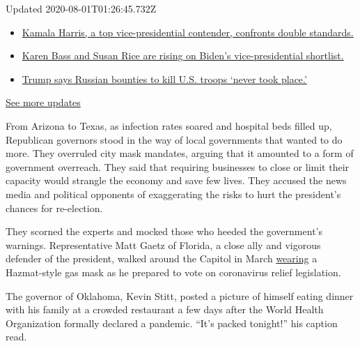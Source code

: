 Updated 2020-08-01T01:26:45.732Z

\begin{itemize}
\tightlist
\item
  \href{https://www.nytimes.com/2020/07/31/us/elections/biden-vs-trump.html?action=click\&pgtype=Article\&state=default\&region=MAIN_CONTENT_1\&context=storylines_live_updates\#link-29fdff45}{Kamala
  Harris, a top vice-presidential contender, confronts double
  standards.}
\item
  \href{https://www.nytimes.com/2020/07/31/us/elections/biden-vs-trump.html?action=click\&pgtype=Article\&state=default\&region=MAIN_CONTENT_1\&context=storylines_live_updates\#link-13ec3d9c}{Karen
  Bass and Susan Rice are rising on Biden's vice-presidential
  shortlist.}
\item
  \href{https://www.nytimes.com/2020/07/31/us/elections/biden-vs-trump.html?action=click\&pgtype=Article\&state=default\&region=MAIN_CONTENT_1\&context=storylines_live_updates\#link-49e9a016}{Trump
  says Russian bounties to kill U.S. troops `never took place.'}
\end{itemize}

\href{https://www.nytimes.com/2020/07/31/us/elections/biden-vs-trump.html?action=click\&pgtype=Article\&state=default\&region=MAIN_CONTENT_1\&context=storylines_live_updates}{See
more updates}

From Arizona to Texas, as infection rates soared and hospital beds
filled up, Republican governors stood in the way of local governments
that wanted to do more. They overruled city mask mandates, arguing that
it amounted to a form of government overreach. They said that requiring
businesses to close or limit their capacity would strangle the economy
and save few lives. They accused the news media and political opponents
of exaggerating the risks to hurt the president's chances for
re-election.

They scorned the experts and mocked those who heeded the government's
warnings. Representative Matt Gaetz of Florida, a close ally and
vigorous defender of the president, walked around the Capitol in March
\href{https://twitter.com/RepMattGaetz/status/1235309294146539520?ref_src=twsrc\%5Etfw\%7Ctwcamp\%5Etweetembed\%7Ctwterm\%5E1235309294146539520\%7Ctwgr\%5E\&ref_url=https\%3A\%2F\%2Fwww.cnn.com\%2F2020\%2F03\%2F04\%2Fpolitics\%2Fgaetz-coronavirus-gas-mask\%2Findex.html}{wearing}
a Hazmat-style gas mask as he prepared to vote on coronavirus relief
legislation.

The governor of Oklahoma, Kevin Stitt, posted a picture of himself
eating dinner with his family at a crowded restaurant a few days after
the World Health Organization formally declared a pandemic. ``It's
packed tonight!'' his caption read.

